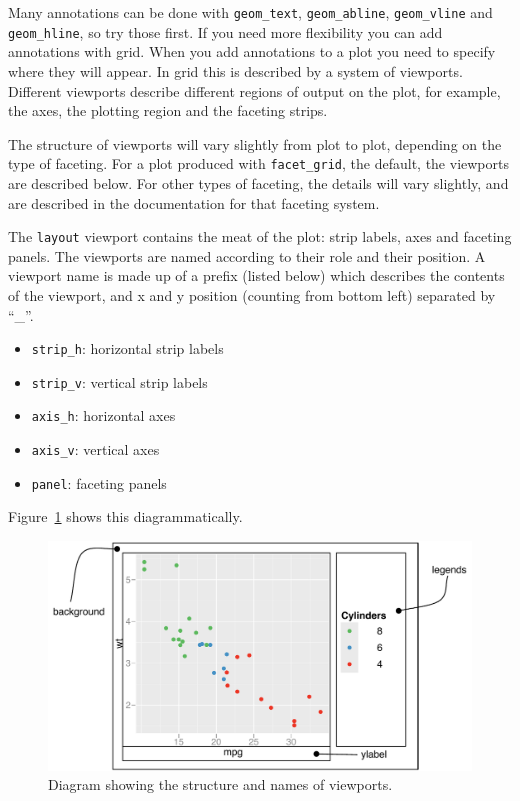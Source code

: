 Many annotations can be done with {\tt geom\_text}, {\tt geom\_abline}, {\tt geom\_vline} and {\tt geom\_hline}, so try those first.  If you need more flexibility you can add annotations with grid.  When you add annotations to a plot you need to specify where they will appear.  In grid this is described by a system of viewports.  Different viewports describe different regions of output on the plot, for example, the axes, the plotting region and the faceting strips.

The structure of viewports will vary slightly from plot to plot, depending on the type of faceting.  For a plot produced with {\tt facet\_grid}, the default, the viewports are described below.  For other types of faceting, the details will vary slightly, and are described in the documentation for that faceting system.  

The {\tt layout} viewport contains the meat of the plot: strip labels, axes and faceting panels.  The viewports are named according to their role and their position.  A viewport name is made up of a prefix (listed below) which describes the contents of the viewport, and x and y position (counting from bottom left) separated by ``\_''.

\begin{itemize}
  \item {\tt strip\_h}: horizontal strip labels
  \item {\tt strip\_v}: vertical strip labels
  \item {\tt axis\_h}: horizontal axes
  \item {\tt axis\_v}: vertical axes
  \item {\tt panel}: faceting panels
\end{itemize}

Figure~\ref{fig:viewports} shows this diagrammatically.

\begin{figure}[htbp]
  \centering
    \includegraphics[width=\textwidth]{grid-viewports.pdf}
  \caption{Diagram showing the structure and names of viewports.}
  \label{fig:viewports}
\end{figure}

